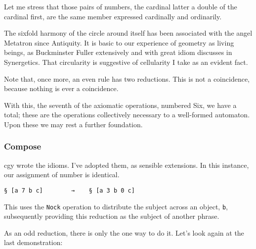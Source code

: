 \documentclass[twoside]{article}
\begin{document}
Let me stress that those pairs of numbers, the cardinal latter a double of the cardinal first, are the same member expressed cardinally and ordinarily.

The sixfold harmony of the circle around itself has been associated with the angel Metatron since Antiquity. It is basic to our experience of geometry as living beings, as Buckminster Fuller extensively and with great idiom discusses in Synergetics. That circularity is suggestive of cellularity I take as an evident fact.

Note that, once more, an even rule has two reductions.  This is not a coincidence, because nothing is ever a coincidence.

With this, the seventh of the axiomatic operations, numbered Six, we have a total; these are the operations collectively necessary to a well-formed automaton. Upon these we may rest a further foundation.



\subsubsection{Compose}

cgy wrote the idioms. I've adopted them, as sensible extensions. In this instance, our assignment of number is identical.

\begin{lstlisting}[style=listingcode]
§ [a 7 b c]        →    § [a 3 b 0 c]
\end{lstlisting}

This uses the \texttt{Nock} operation to distribute the subject across an object, \texttt{b}, subsequently providing this reduction as the subject of another phrase.

As an odd reduction, there is only the one way to do it. Let's look again at the last demonstration:
\end{document}

